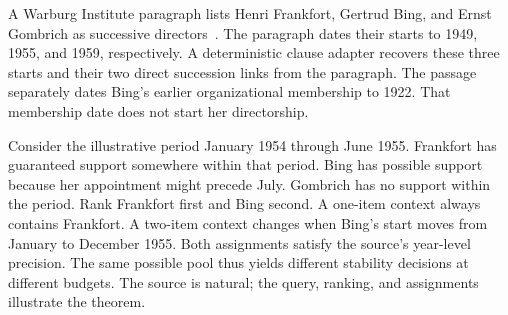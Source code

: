 A Warburg Institute paragraph lists Henri Frankfort, Gertrud Bing, and Ernst Gombrich as successive directors~\citep{chen2021timeqa}.
The paragraph dates their starts to 1949, 1955, and 1959, respectively.
A deterministic clause adapter recovers these three starts and their two direct succession links from the paragraph.
The passage separately dates Bing's earlier organizational membership to 1922.
That membership date does not start her directorship.

Consider the illustrative period January 1954 through June 1955.
Frankfort has guaranteed support somewhere within that period.
Bing has possible support because her appointment might precede July.
Gombrich has no support within the period.
Rank Frankfort first and Bing second.
A one-item context always contains Frankfort.
A two-item context changes when Bing's start moves from January to December 1955.
Both assignments satisfy the source's year-level precision.
The same possible pool thus yields different stability decisions at different budgets.
The source is natural; the query, ranking, and assignments illustrate the theorem.
